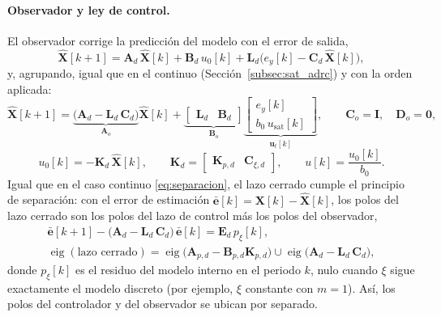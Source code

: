 \paragraph{Observador y ley de control.} El observador corrige la predicción
del modelo con el error de salida,
\begin{equation}
\widehat{\mathbf{X}}[k+1] = \mathbf{A}_d\,\widehat{\mathbf{X}}[k] + \mathbf{B}_d\,u_0[k]
+ \mathbf{L}_d\bigl(e_y[k] - \mathbf{C}_d\,\widehat{\mathbf{X}}[k]\bigr),
\label{eq:disc_observador_pred}
\end{equation}
y, agrupando, igual que en el continuo (Sección~\ref{subsec:sat_adrc}) y con la
orden aplicada:
\begin{equation}
\widehat{\mathbf{X}}[k+1] = \underbrace{\bigl(\mathbf{A}_d - \mathbf{L}_d\,\mathbf{C}_d\bigr)}_{\mathbf{A}_o}\widehat{\mathbf{X}}[k]
+ \underbrace{\begin{bmatrix} \mathbf{L}_d & \mathbf{B}_d \end{bmatrix}}_{\mathbf{B}_o}
\underbrace{\begin{bmatrix} e_y[k] \\ b_0\,u_{\mathrm{sat}}[k] \end{bmatrix}}_{\mathbf{u}_t[k]},
\qquad
\mathbf{C}_o = \mathbf{I},\quad \mathbf{D}_o = \mathbf{0},
\label{eq:disc_observador}
\end{equation}
\begin{equation}
u_0[k] = -\mathbf{K}_d\,\widehat{\mathbf{X}}[k],
\qquad \mathbf{K}_d = \begin{bmatrix} \mathbf{K}_{p,d} & \mathbf{C}_{\xi,d} \end{bmatrix},
\qquad u[k] = \frac{u_0[k]}{b_0} .
\label{eq:disc_ley}
\end{equation}
Igual que en el caso continuo \eqref{eq:separacion}, el lazo cerrado cumple el principio de
separación: con el error de estimación $\bar{\mathbf{e}}[k] = \mathbf{X}[k] - \widehat{\mathbf{X}}[k]$,
los polos del lazo cerrado son los polos del lazo de control más los polos del observador,
\begin{equation}
\begin{gathered}
\bar{\mathbf{e}}[k+1] - \bigl(\mathbf{A}_d - \mathbf{L}_d\,\mathbf{C}_d\bigr)\,\bar{\mathbf{e}}[k] = \mathbf{E}_d\,p_{\xi}[k],\\[4pt]
\operatorname{eig}(\text{lazo cerrado}) =
\operatorname{eig}\bigl(\mathbf{A}_{p,d} - \mathbf{B}_{p,d}\mathbf{K}_{p,d}\bigr) \cup
\operatorname{eig}\bigl(\mathbf{A}_d - \mathbf{L}_d\,\mathbf{C}_d\bigr),
\end{gathered}
\label{eq:disc_separacion}
\end{equation}
donde $p_{\xi}[k]$ es el residuo del modelo interno en el periodo $k$, nulo
cuando $\xi$ sigue exactamente el modelo discreto (por ejemplo, $\xi$ constante
con $m = 1$). Así, los polos del controlador y del observador se ubican por separado.

